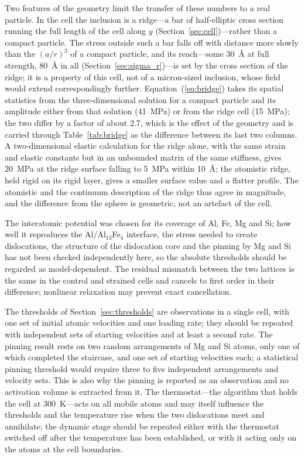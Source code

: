 Two features of the geometry limit the transfer of these numbers to a real
particle. In the cell the inclusion is a ridge---a bar of half-elliptic cross
section running the full length of the cell along $y$
(Section~\ref{sec:cell})---rather than a compact particle. The stress outside
such a bar falls off with distance more slowly than the $(a/r)^{3}$ of a
compact particle, and its reach---some 30~\AA{} at full strength, 80~\AA{} in all
(Section~\ref{sec:sigma_r})---is set by the cross section of the ridge; it is a property of this cell, not of a micron-sized inclusion, whose
field would extend correspondingly further. Equation~(\ref{eq:bridge}) takes
its spatial statistics from the three-dimensional solution for a compact
particle and its amplitude either from that solution (41~MPa) or from the
ridge cell (15~MPa); the two differ by a factor of about
2.7, which is the effect of the geometry and is carried
through Table~\ref{tab:bridge} as the difference between its last two
columns. A two-dimensional elastic calculation for the ridge alone, with
the same strain and elastic constants but in an unbounded matrix of the same
stiffness, gives 20~MPa at the ridge surface falling to 5~MPa
within 10~\AA{}; the atomistic ridge, held rigid on its rigid layer, gives a
smaller surface value and a flatter profile. The atomistic and the continuum
description of the ridge thus agree in magnitude, and the difference from
the sphere is geometric, not an artefact of the cell.

The interatomic potential \cite{Jelinek2012} was chosen for its coverage of
Al, Fe, Mg and Si; how well it reproduces the Al/Al$_{13}$Fe$_4$ interface,
the stress needed to create dislocations, the structure of the dislocation
core and the pinning by Mg and Si has not been checked independently here, so
the absolute thresholds should be regarded as model-dependent. The residual
mismatch between the two lattices is the same in the control and strained
cells and cancels to first order in their difference; nonlinear relaxation may
prevent exact cancellation.

The thresholds of Section~\ref{sec:thresholds} are observations in a single
cell, with one set of initial atomic velocities and one loading rate; they
should be repeated with independent sets of starting velocities and at least a
second rate. The pinning result rests on two random arrangements of Mg and Si atoms,
only one of which completed the staircase, and one set of starting
velocities each; a statistical pinning threshold
would require three to five independent arrangements and velocity sets. This
is also why the pinning is reported as an observation and no activation
volume is extracted from it. The thermostat---the algorithm that holds the
cell at 300~K---acts on all mobile atoms and may itself influence the
thresholds and the temperature rise when the two dislocations meet and
annihilate; the dynamic stage should
be repeated either with the thermostat switched off after the temperature has
been established, or with it acting only on the atoms at the cell boundaries.

